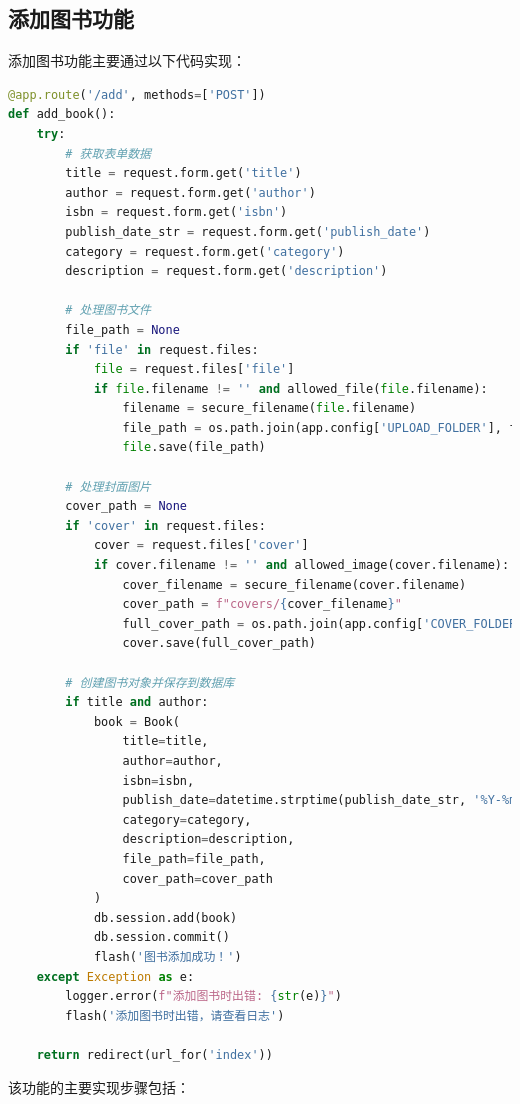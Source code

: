 \documentclass{SYSUReport}
\begin{document}
\subsection{添加图书功能}
添加图书功能主要通过以下代码实现：

\begin{lstlisting}[language=Python]
@app.route('/add', methods=['POST'])
def add_book():
    try:
        # 获取表单数据
        title = request.form.get('title')
        author = request.form.get('author')
        isbn = request.form.get('isbn')
        publish_date_str = request.form.get('publish_date')
        category = request.form.get('category')
        description = request.form.get('description')
        
        # 处理图书文件
        file_path = None
        if 'file' in request.files:
            file = request.files['file']
            if file.filename != '' and allowed_file(file.filename):
                filename = secure_filename(file.filename)
                file_path = os.path.join(app.config['UPLOAD_FOLDER'], filename)
                file.save(file_path)
        
        # 处理封面图片
        cover_path = None
        if 'cover' in request.files:
            cover = request.files['cover']
            if cover.filename != '' and allowed_image(cover.filename):
                cover_filename = secure_filename(cover.filename)
                cover_path = f"covers/{cover_filename}"
                full_cover_path = os.path.join(app.config['COVER_FOLDER'], cover_filename)
                cover.save(full_cover_path)
        
        # 创建图书对象并保存到数据库
        if title and author:
            book = Book(
                title=title,
                author=author,
                isbn=isbn,
                publish_date=datetime.strptime(publish_date_str, '%Y-%m-%d').date() if publish_date_str else None,
                category=category,
                description=description,
                file_path=file_path,
                cover_path=cover_path
            )
            db.session.add(book)
            db.session.commit()
            flash('图书添加成功！')
    except Exception as e:
        logger.error(f"添加图书时出错: {str(e)}")
        flash('添加图书时出错，请查看日志')
    
    return redirect(url_for('index'))
\end{lstlisting}

该功能的主要实现步骤包括：
\end{document}
